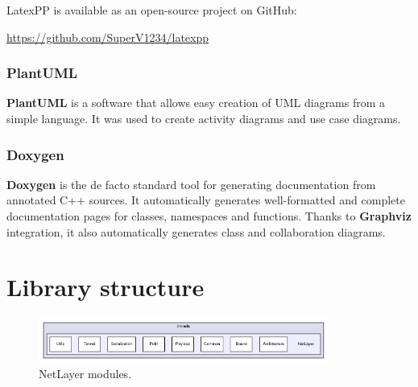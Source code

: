 \documentclass[12pt]{report}
\newcommand{\+}{\discretionary{\mbox{\scriptsize$\hookleftarrow$}}{}{}}
\renewcommand\emph{\textbf}
\begin{document}
                    LatexPP is available as an open-source project on GitHub:

                    \url{https://github.com/SuperV1234/latexpp}

                \subsection{PlantUML}
                    \emph{PlantUML} is a software that allows easy creation of UML diagrams from a simple language. It was used to create activity diagrams and use case diagrams.

                \subsection{Doxygen}
                    \emph{Doxygen} is the de facto standard tool for generating documentation from annotated C++ sources. It automatically generates well-formatted and complete documentation pages for classes, namespaces and functions. Thanks to \emph{Graphviz} integration, it also automatically generates class and collaboration diagrams.

\chapter{Library structure}

    \begin{figure}[!htb]
    \caption{NetLayer modules.}
    \centering
    \includegraphics[width=0.85\textwidth]{inc/0.png}
    \end{figure}
\end{document}
